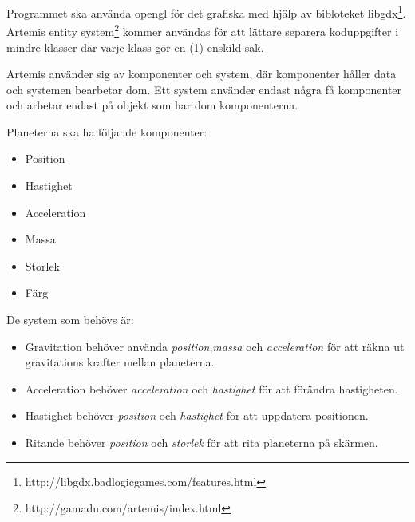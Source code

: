 Programmet ska använda opengl för det grafiska med hjälp av bibloteket
libgdx\footnote{http://libgdx.badlogicgames.com/features.html}.
Artemis entity system\footnote{http://gamadu.com/artemis/index.html}
kommer användas för att lättare separera koduppgifter i mindre
klasser där varje klass gör en (1) enskild sak.

Artemis använder sig av komponenter och system,
där komponenter håller data och systemen bearbetar dom.
Ett system använder endast några få komponenter och
arbetar endast på objekt som har dom komponenterna.

\noindent
Planeterna ska ha följande komponenter:
\begin{itemize}
    \item Position
    \item Hastighet
    \item Acceleration
    \item Massa
    \item Storlek
    \item Färg
\end{itemize}

\noindent
De system som behövs är:
\begin{itemize}
    \item Gravitation behöver använda
        \textit{position},\textit{massa} och \textit{acceleration}
        för att räkna ut gravitations krafter mellan planeterna.
    \item Acceleration behöver \textit{acceleration} och \textit{hastighet}
        för att förändra hastigheten.
    \item Hastighet behöver \textit{position} och \textit{hastighet}
        för att uppdatera positionen.
    \item Ritande behöver \textit{position} och \textit{storlek}
        för att rita planeterna på skärmen.
\end{itemize}

